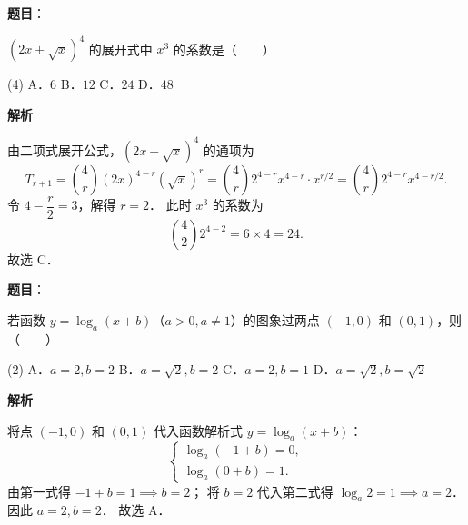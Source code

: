 \begin{answer}

\textbf{题目}：

$(2x + \sqrt{x})^4$ 的展开式中 $x^3$ 的系数是\mbox{（　　）}

\begin{gkopts}(4)
\task A．$6$
\task B．$12$
\task C．$24$
\task D．$48$
\end{gkopts}

\textbf{解析}

由二项式展开公式，$(2x + \sqrt{x})^4$ 的通项为
\nopagebreak[4]
\[
T_{r+1} = \binom{4}{r} (2x)^{4-r} (\sqrt{x})^r = \binom{4}{r} 2^{4-r} x^{4-r} \cdot x^{r/2} = \binom{4}{r} 2^{4-r} x^{4 - r/2}.
\]
令 $4 - \dfrac{r}{2} = 3$，解得 $r = 2$．
此时 $x^3$ 的系数为
\nopagebreak[4]
\[
\binom{4}{2} 2^{4-2} = 6 \times 4 = 24.
\]
故选 C．


\end{answer}
\begin{answer}

\textbf{题目}：

若函数 $y = \log_a(x + b)$（$a > 0, a \neq 1$）的图象过两点 $(-1, 0)$ 和 $(0, 1)$，则\mbox{（　　）}

\begin{gkopts}(2)
\task A．$a = 2, b = 2$
\task B．$a = \sqrt{2}, b = 2$
\task C．$a = 2, b = 1$
\task D．$a = \sqrt{2}, b = \sqrt{2}$
\end{gkopts}

\textbf{解析}

将点 $(-1, 0)$ 和 $(0, 1)$ 代入函数解析式 $y = \log_a(x + b)$：
\nopagebreak[4]
\[
\begin{cases}
\log_a(-1 + b) = 0, \\
\log_a(0 + b) = 1.
\end{cases}
\]
由第一式得 $-1 + b = 1 \implies b = 2$；
将 $b = 2$ 代入第二式得 $\log_a 2 = 1 \implies a = 2$．
因此 $a = 2, b = 2$．
故选 A．


\end{answer}

